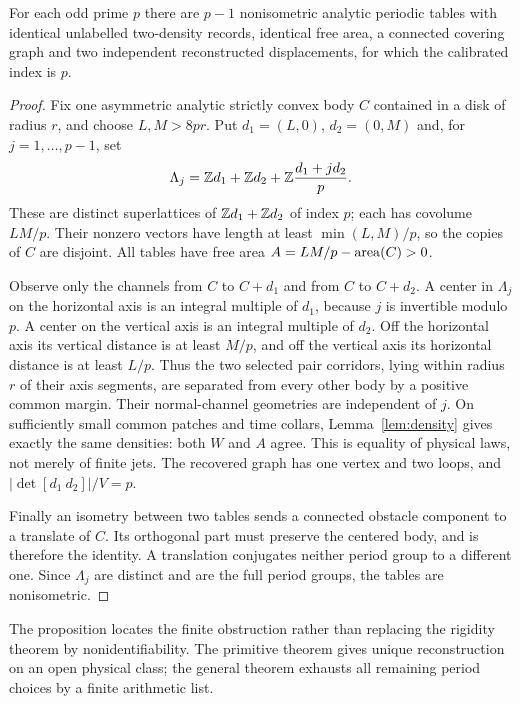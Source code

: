 \begin{proposition}\label{prop:ambiguity}
For each odd prime $p$ there are $p-1$ nonisometric analytic periodic
tables with identical unlabelled two-density records, identical free area,
a connected covering graph and two independent reconstructed displacements,
for which the calibrated index is $p$.
\end{proposition}
\begin{proof}
Fix one asymmetric analytic strictly convex body $C$ contained in a disk
of radius $r$, and choose $L,M>8pr$. Put $d_1=(L,0)$, $d_2=(0,M)$
and, for $j=1,\ldots,p-1$, set
\[
 \Lambda_j=\mathbb Z d_1+\mathbb Z d_2+
                      \mathbb Z\frac{d_1+j d_2}{p}.
\]
These are distinct superlattices of $\mathbb Z d_1+\mathbb Z d_2$ of index $p$;
each has covolume $LM/p$. Their nonzero vectors have length at least
$\min(L,M)/p$, so the copies of $C$ are disjoint. All tables have free
area $A=LM/p-\operatorname{area}(C)>0$.

Observe only the channels from $C$ to $C+d_1$ and from $C$ to $C+d_2$.
A center in $\Lambda_j$ on the horizontal axis is an integral multiple
of $d_1$, because $j$ is invertible modulo $p$. A center on the vertical
axis is an integral multiple of $d_2$. Off the horizontal axis its
vertical distance is at least $M/p$, and off the vertical axis its
horizontal distance is at least $L/p$. Thus the two selected pair
corridors, lying within radius $r$ of their axis segments, are separated
from every other body by a positive common margin. Their normal-channel
geometries are independent of $j$. On sufficiently small common patches
and time collars, Lemma~\ref{lem:density} gives exactly the same densities:
both $W$ and $A$ agree. This is equality of physical laws, not merely
of finite jets. The recovered graph has one vertex and two loops, and
$|\det[d_1\ d_2]|/V=p$.

Finally an isometry between two tables sends a connected obstacle component
to a translate of $C$. Its orthogonal part must preserve the centered body,
and is therefore the identity. A translation conjugates neither period
group to a different one. Since $\Lambda_j$ are distinct and are the full
period groups, the tables are nonisometric.
\end{proof}

The proposition locates the finite obstruction rather than replacing the
rigidity theorem by nonidentifiability. The primitive theorem gives unique
reconstruction on an open physical class; the general theorem exhausts
all remaining period choices by a finite arithmetic list.
